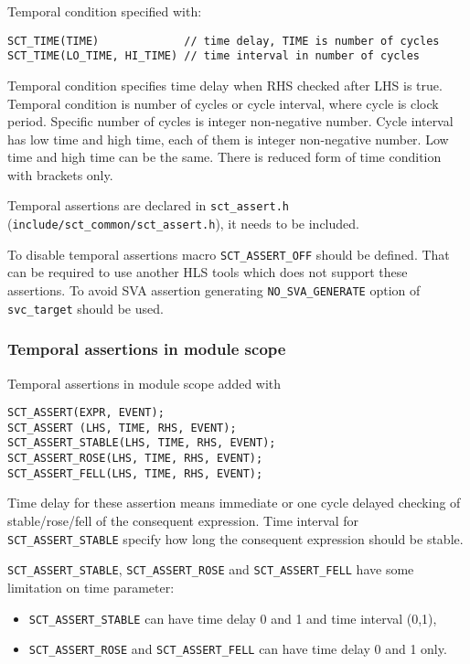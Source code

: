 Temporal condition specified with:
\begin{lstlisting}[style=mycpp]
SCT_TIME(TIME)             // time delay, TIME is number of cycles
SCT_TIME(LO_TIME, HI_TIME) // time interval in number of cycles
\end{lstlisting}

Temporal condition specifies time delay when RHS checked after LHS is true. Temporal condition is number of cycles or cycle interval, where cycle is clock period. Specific number of cycles is integer non-negative number. Cycle interval has low time and high time, each of them is integer non-negative number. Low time and high time can be the same. There is reduced form of time condition with brackets only.

Temporal assertions are declared in {\tt sct\_assert.h} ({\tt include/sct\_common/sct\_assert.h}), it needs to be included. 

To disable temporal assertions macro {\tt SCT\_ASSERT\_OFF} should be defined. That can be required to use another HLS tools which does not support these assertions.
To avoid SVA assertion generating {\tt NO\_SVA\_GENERATE} option of {\tt svc\_target} should be used. 

\subsubsection{Temporal assertions in module scope}

Temporal assertions in module scope added with 

\begin{lstlisting}[style=mycpp]
SCT_ASSERT(EXPR, EVENT);
SCT_ASSERT (LHS, TIME, RHS, EVENT);
SCT_ASSERT_STABLE(LHS, TIME, RHS, EVENT);      
SCT_ASSERT_ROSE(LHS, TIME, RHS, EVENT);        
SCT_ASSERT_FELL(LHS, TIME, RHS, EVENT); 
\end{lstlisting}
%
Time delay for these assertion means immediate or one cycle delayed checking of stable/rose/fell of the consequent expression. Time interval for {\tt SCT\_ASSERT\_STABLE} specify how long the consequent expression should be stable.

{\tt SCT\_ASSERT\_STABLE}, {\tt SCT\_ASSERT\_ROSE} and {\tt SCT\_ASSERT\_FELL} have some limitation on time parameter:
\begin{itemize}
\item {\tt SCT\_ASSERT\_STABLE} can have time delay 0 and 1 and time interval (0,1),
\item {\tt SCT\_ASSERT\_ROSE} and {\tt SCT\_ASSERT\_FELL} can have time delay 0 and 1 only.
\end{itemize}



